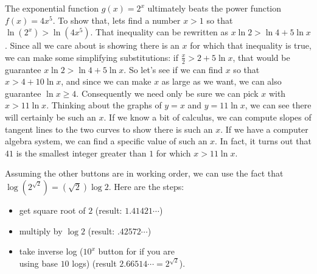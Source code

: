 \begin{Solution}{12.6}


The exponential function $g(x) = 2^x$ ultimately beats the power function $f(x) = 4x^5$. 
To show that, lets find a number $x>1$ so that
$\ln(2^x) > \ln(4x^5)$.   That inequality can be rewritten as $x\ln{2} > \ln{4} + 5\ln{x}$.
Since all we care about is showing there is an $x$ for which that inequality is true, we can 
make some simplifying substitutions:  if $\frac{x}{2} > 2 +5\ln{x}$, that would be guarantee 
$x\ln{2} > \ln{4} + 5\ln{x}$. So let's see if we can find $x$ so that $x > 4 + 10\ln{x}$, and since
we can make $x$ as large as we want, we can also guarantee $\ln{x}\geq 4$. Consequently
we need only be sure we can pick $x$ with $x > 11\ln{x}$. Thinking about the graphs of
$y = x$ and $y = 11 \ln{x}$, we can see there will certainly be such an $x$.  If we know a bit 
of calculus, we can compute slopes of tangent lines to the two curves to show there is such an $x$.
If we have a computer algebra system, we can find a specific value of such an $x$. In fact, 
it turns out that $41$ is the smallest integer greater than $1$ for which $x > 11\ln{x}$. \\[5pt]


\end{Solution}

\begin{Solution}{12.7}

Assuming the other buttons are in working order, we can use the fact that $\log(2^{\sqrt{2}})= (\sqrt{2})\log{2}$.
Here are the steps:
\begin{itemize}
\item get square root of $2$ (result: $1.41421\cdots$)\\
\item multiply by $\log{2}$ (result: $.42572\cdots$)\\
\item take inverse log ($10^x$ button for if you are \\
using base $10$ logs) (result $2.66514\cdots = 2^{\sqrt{2}}$).\\[5pt]
\end{itemize}

\end{Solution} 
